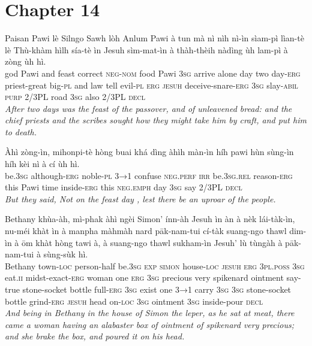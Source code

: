 \documentclass[11pt,a4paper]{article}
\begin{document}
\section*{Chapter 14}

\begin{exe}
\gll Paisan Pawi lè Silngo Sawh lòh Anlum Pawi à tun mà nì nìh nì-ìn sìam-pì lìan-tè lè Thù-khàm hìlh sía-tè ìn Jesuh sìm-mat-ìn à thàh-thèih nàdìng ùh lam-pì à zòng ùh hì. \\
     god Pawi and feast correct \textsc{neg}-\textsc{nom} food Pawi \textsc{3sg} arrive alone day two day-\textsc{erg} priest-great big-\textsc{pl} and law tell evil-\textsc{pl} \textsc{erg} \textsc{jesuh} deceive-snare-\textsc{erg} \textsc{3sg} slay-\textsc{abil} \textsc{purp} 2/3PL road \textsc{3sg} also 2/3PL \textsc{decl} \\
\glt \textcolor{kjvcolor}{\textit{After two days was the feast of the passover, and of unleavened bread: and the chief priests and the scribes sought how they might take him by craft, and put him to death.}}

\gll Àhì zòng-ìn, mihonpi-tè hòng buai khá dìng àhìh màn-ìn híh pawi hùn sùng-ìn híh kèi nì à cí ùh hì. \\
     be.\textsc{3sg} although-\textsc{erg} noble-\textsc{pl} \textsc{3→1} confuse \textsc{neg}.\textsc{perf} \textsc{irr} be.\textsc{3sg}.\textsc{rel} reason-\textsc{erg} this Pawi time inside-\textsc{erg} this \textsc{neg}.\textsc{emph} day \textsc{3sg} say 2/3PL \textsc{decl} \\
\glt \textcolor{kjvcolor}{\textit{But they said, Not on the feast day , lest there be an uproar of the people.}}

\gll Bethany khùa-àh, mì-phak àhì ngèi Simon' ínn-àh Jesuh ìn àn à nèk lái-tàk-ìn, nu-méi khàt ìn à manpha màhmàh nard pāk-nam-tui cí-tàk suang-ngo thawl dim-ìn à ōm khàt hòng tawi à, à suang-ngo thawl sukham-ìn Jesuh' lù tùngàh à pāk-nam-tui à sùng-sùk hì. \\
     Bethany town-\textsc{loc} person-half be.\textsc{3sg} \textsc{exp} \textsc{simon} house-\textsc{loc} \textsc{jesuh} \textsc{erg} \textsc{3pl}.\textsc{poss} \textsc{3sg} eat.\textsc{ii} midst-exact-\textsc{erg} woman one \textsc{erg} \textsc{3sg} precious very spikenard ointment say-true stone-socket bottle full-\textsc{erg} \textsc{3sg} exist one \textsc{3→1} carry \textsc{3sg} \textsc{3sg} stone-socket bottle grind-\textsc{erg} \textsc{jesuh} head on-\textsc{loc} \textsc{3sg} ointment \textsc{3sg} inside-pour \textsc{decl} \\
\glt \textcolor{kjvcolor}{\textit{And being in Bethany in the house of Simon the leper, as he sat at meat, there came a woman having an alabaster box of ointment of spikenard very precious; and she brake the box, and poured it on his head.}}


\end{exe}
\end{document}
